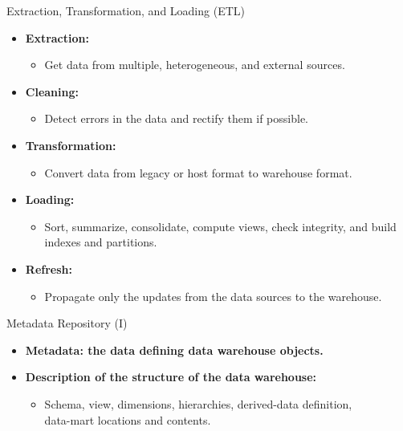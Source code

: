 \begin{frame}{Extraction, Transformation, and Loading (ETL)}
  \begin{itemize}
  \item \textbf{\color{airforceblue}Extraction:}
    \begin{itemize}
    \item Get data from multiple, heterogeneous, and external sources.
    \end{itemize}
  \item \textbf{\color{airforceblue}Cleaning:}
    \begin{itemize}
    \item Detect errors in the data and rectify them if possible.
    \end{itemize}
  \item \textbf{\color{airforceblue}Transformation:}
    \begin{itemize}
    \item Convert data from legacy or host format to warehouse format.
    \end{itemize}
  \item \textbf{\color{airforceblue}Loading:}
    \begin{itemize}
    \item Sort, summarize, consolidate, compute views, check integrity, and build indexes and partitions.
    \end{itemize}
  \item \textbf{\color{airforceblue}Refresh:}
    \begin{itemize}
    \item Propagate only the updates from the data sources to the warehouse.
    \end{itemize}
  \end{itemize}
\end{frame}

\begin{frame}{Metadata Repository (I)}
  \begin{itemize}
  \item \textbf{Metadata: the data defining data warehouse objects.}
  \item \textbf{Description of the {\color{airforceblue}structure} of the data warehouse:}
    \begin{itemize}
    \item Schema, view, dimensions, hierarchies, derived-data definition, \\
      data-mart locations and contents.
    \end{itemize}

  \end{itemize}
\end{frame}


